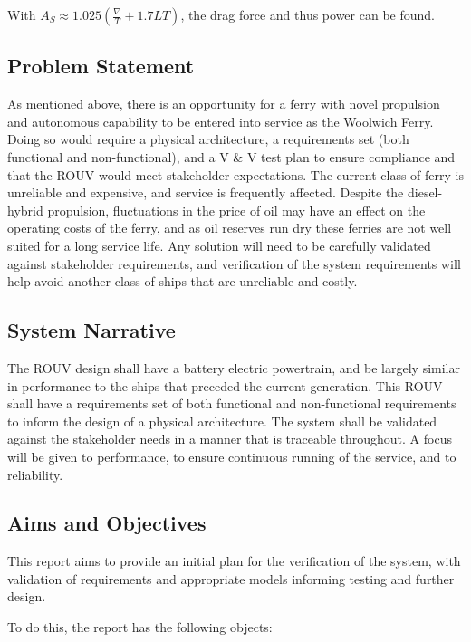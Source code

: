 \documentclass[../main.tex]{subfiles}
\begin{document}
With $A_S \approx 1.025 \left(\frac{\nabla}{T}+1.7LT\right)$\cite{MANEnergySolutions2023}, the drag force and thus power can be found.

\subsection{Problem Statement}
As mentioned above, there is an opportunity for a ferry with novel propulsion and autonomous capability to be entered into service as the Woolwich Ferry.
Doing so would require a physical architecture, a requirements set (both functional and non-functional), and a V \& V test plan to ensure compliance and that the ROUV would meet stakeholder expectations.
The current class of ferry is unreliable and expensive, and service is frequently affected.
Despite the diesel-hybrid propulsion, fluctuations in the price of oil may have an effect on the operating costs of the ferry, and as oil reserves run dry these ferries are not well suited for a long service life.
Any solution will need to be carefully validated against stakeholder requirements, and verification of the system requirements will help avoid another class of ships that are unreliable and costly.

\subsection{System Narrative}
The ROUV design shall have a battery electric powertrain, and be largely similar in performance to the ships that preceded the current generation\cite{royalgreenwich}.
This ROUV shall have a requirements set of both functional and non-functional requirements to inform the design of a physical architecture.
The system shall be validated against the stakeholder needs in a manner that is traceable throughout.
A focus will be given to performance, to ensure continuous running of the service, and to reliability.

\subsection{Aims and Objectives}
This report aims to provide an initial plan for the verification of the system, with validation of requirements and appropriate models informing testing and further design.

To do this, the report has the following objects:
\end{document}
